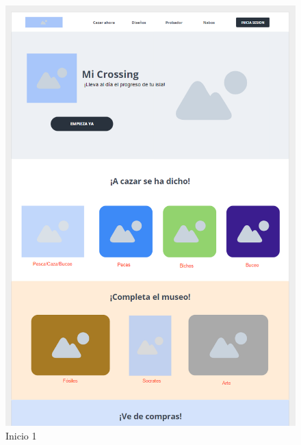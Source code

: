 \begin{figure}[!htb]
	\begin{minipage}{0.48\textwidth}
		\centering
		\includegraphics[width=\linewidth]{img/mockups/Inicio - 1.png}
		\caption{Inicio 1}
		\label{fig:inicio1}
	\end{minipage}\hfill
	\begin{minipage}{0.48\textwidth}
		\centering

\end{minipage}
\end{figure}
